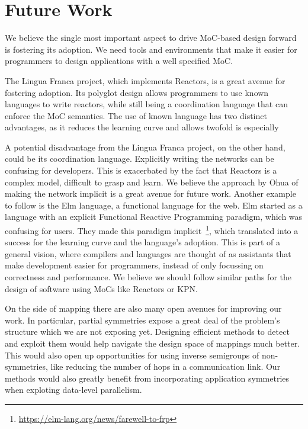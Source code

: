 \section{Future Work}

We believe the single most important aspect to drive \ac{MoC}-based design forward is fostering its adoption.
We need tools and environments that make it easier for programmers to design applications with a well specified \ac{MoC}.

The Lingua Franca project, which implements Reactors, is a great avenue for fostering adoption.
Its polyglot design allows programmers to use known languages to write reactors, while still being a coordination language that can enforce the \ac{MoC} semantics.
The use of known language has two distinct advantages, as it reduces the learning curve and allows  twofold is especially 

A potential disadvantage from the Lingua Franca project, on the other hand, could be its coordination language. 
Explicitly writing the networks can be confusing for developers.
This is exacerbated by the fact that Reactors is a complex model, difficult to grasp and learn.
We believe the approach by Ohua of making the network implicit is a great avenue for future work.
Another example to follow is the Elm language, a functional language for the web.
Elm started as a language with an explicit Functional Reactive Programming paradigm, which was confusing for users.
They made this paradigm implicit~\footnote{\url{https://elm-lang.org/news/farewell-to-frp}}, which translated into a success for the learning curve and the language's adoption.
This is part of a general vision, where compilers and languages are thought of as assistants that make development easier for programmers, instead of only focussing on correctness and performance.
We believe we should follow similar paths for the design of software using \acp{MoC} like Reactors or \ac{KPN}.

On the side of mapping there are also many open avenues for improving our work.
In particular, partial symmetries expose a great deal of the problem's structure which we are not exposing yet.
Designing efficient methods to detect and exploit them would help navigate the design space of mappings much better.
This would also open up opportunities for using inverse semigroups of non-symmetries, like reducing the number of hops in a communication link.
Our methods would also greatly benefit from incorporating application symmetries when exploting data-level parallelism.  


